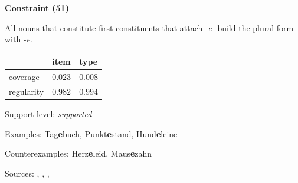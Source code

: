 \begin{center}
\textbf{Constraint (51)}
\end{center}

\noindent
\underline{All} nouns that constitute first constituents that attach -\textit{e}- build the plural form with -\textit{e}.

\newpage

\vspace{0.35em}


\vspace{-0.35em}

\begin{table}[!ht]
\begin{center}

\begin{tabularx}{\columnwidth}{|X|X|X|}
\hline
 & item & type \\
\hline
 coverage & $0.023$ & $0.008$ \\
\hline
 regularity & $0.982$ & $0.994$ \\
\hline
\end{tabularx}
\end{center}
\end{table}

\vspace{-1.35em}

\noindent
Support level: \textit{supported}

\vspace{0.3em}

\noindent
Examples: Tag\textbf{e}buch, Punkt\textbf{e}stand, Hund\textbf{e}leine

\noindent
Counterexamples: Herz\textbf{e}leid, Maus\textbf{e}zahn

\vspace{0.3em}

\noindent
Sources: \citet[9, 18]{kuerschner_2010}, \citet[5]{nuebling_szczepaniak_2008}, \citet[70, 81]{nuebling_szczepaniak_2013}, \citet[102]{ortner_mueller-bollhagen_1991}


